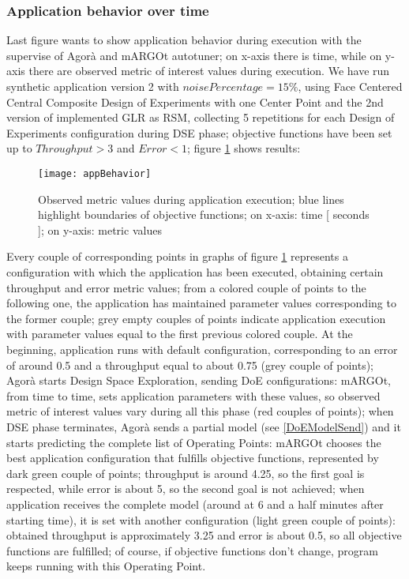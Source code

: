 \subsubsection{Application behavior over time}

Last figure wants to show application behavior during execution with the supervise of Agorà and mARGOt autotuner; on x-axis there is time, while on y-axis there are observed metric of interest values during execution. We have run synthetic application version 2 with $noisePercentage = 15\%$, using Face Centered Central Composite Design of Experiments with one Center Point and the 2nd version of implemented GLR as RSM, collecting 5 repetitions for each Design of Experiments configuration during DSE phase; objective functions have been set up to $Throughput > 3$ and $Error < 1$; figure \ref{fig::appBeh} shows results:

\begin{figure}[H]

    \centering
    \texttt{[image: appBehavior]}
    \caption[Observed metric values during application execution]{Observed metric values during application execution; blue lines highlight boundaries of objective functions; on x-axis: time [ seconds ]; on y-axis: metric values}
    \label{fig::appBeh}
    
\end{figure}

Every couple of corresponding points in graphs of figure \ref{fig::appBeh} represents a configuration with which the application has been executed, obtaining certain throughput and error metric values; from a colored couple of points to the following one, the application has maintained parameter values corresponding to the former couple; grey empty couples of points indicate application execution with parameter values equal to the first previous colored couple. At the beginning, application runs with default configuration, corresponding to an error of around 0.5 and a throughput equal to about 0.75 (grey couple of points); Agorà starts Design Space Exploration, sending DoE configurations: mARGOt, from time to time, sets application parameters with these values, so observed metric of interest values vary during all this phase (red couples of points); when DSE phase terminates, Agorà sends a partial model (see \ref{DoEModelSend}) and it starts predicting the complete list of Operating Points: mARGOt chooses the best application configuration that fulfills objective functions, represented by dark green couple of points; throughput is around 4.25, so the first goal is respected, while error is about 5, so the second goal is not achieved; when application receives the complete model (around at 6 and a half minutes after starting time), it is set with another configuration (light green couple of points): obtained throughput is approximately 3.25 and error is about 0.5, so all objective functions are fulfilled; of course, if objective functions don't change, program keeps running with this Operating Point.




